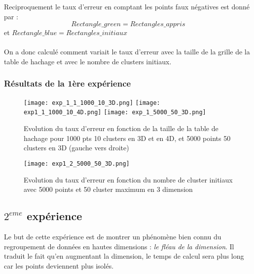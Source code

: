 \documentclass[a4paper,english,titlepage]{article}
\begin{document}
Reciproquement le taux d'erreur en comptant les points faux négatives est donné par :\\ $$Rectangle\_green = Rectangles\_appris$$ et  $Rectangle\_blue = Rectangles\_initiaux$\\
\\On a donc calculé comment variait le taux d'erreur avec la taille de la grille de la table de hachage et  avec le nombre de clusters initiaux.\\

\subsubsection{Résultats de la 1ère expérience}

\begin{figure}[h!]
		\hspace*{0mm}\vfill
		\begin{center}		
		\texttt{[image: exp\_1\_1\_1000\_10\_3D.png]}
		\texttt{[image: exp1\_1\_1000\_10\_4D.png]}
		\texttt{[image: exp\_1\_5000\_50\_3D.png]}
		
		\caption{Evolution du taux d'erreur en fonction de la taille de la table de hachage pour 1000 pts 10 clusters en 3D et en 4D, et 5000 points 50 clusters en 3D (gauche vers droite) }
 	 	\end{center}  
		\vfill\hspace*{0mm}	
	\end{figure}
  	
	\begin{figure}[h!]
		\hspace*{0mm}\vfill
		\begin{center}		
		\texttt{[image: exp1\_2\_5000\_50\_3D.png]}
		\caption{Evolution du taux d'erreur en fonction du nombre de cluster initiaux avec 5000 points et 50 cluster maximum en 3 dimension}
 	 	\end{center}  
		\vfill\hspace*{0mm}	
	\end{figure}

\subsection{$2^{eme}$ expérience}
Le but de cette expérience est de montrer un phénomène bien connu du regroupement de données en hautes dimensions : \textit{le fléau de la dimension}. 
Il traduit le fait  qu'en augmentant la dimension, le temps de calcul sera plus long car les points deviennent plus isolés.\\
\end{document}
